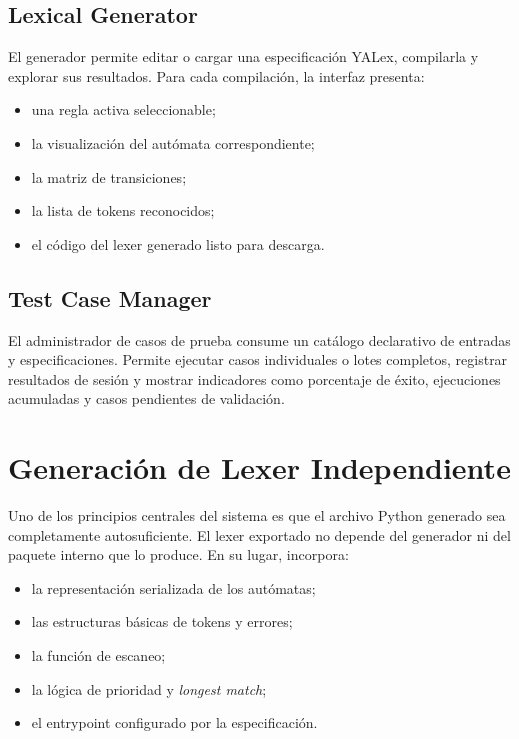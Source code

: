 \documentclass[12pt,a4paper]{article}
\begin{document}
\subsection{Lexical Generator}

El generador permite editar o cargar una especificación YALex, compilarla y explorar sus resultados. Para cada compilación, la interfaz presenta:

\begin{itemize}[leftmargin=2em]
  \item una regla activa seleccionable;
  \item la visualización del autómata correspondiente;
  \item la matriz de transiciones;
  \item la lista de tokens reconocidos;
  \item el código del lexer generado listo para descarga.
\end{itemize}

\subsection{Test Case Manager}

El administrador de casos de prueba consume un catálogo declarativo de entradas y especificaciones. Permite ejecutar casos individuales o lotes completos, registrar resultados de sesión y mostrar indicadores como porcentaje de éxito, ejecuciones acumuladas y casos pendientes de validación.

\section{Generación de Lexer Independiente}

Uno de los principios centrales del sistema es que el archivo Python generado sea completamente autosuficiente. El lexer exportado no depende del generador ni del paquete interno que lo produce. En su lugar, incorpora:

\begin{itemize}[leftmargin=2em]
  \item la representación serializada de los autómatas;
  \item las estructuras básicas de tokens y errores;
  \item la función de escaneo;
  \item la lógica de prioridad y \emph{longest match};
  \item el entrypoint configurado por la especificación.
\end{itemize}
\end{document}
